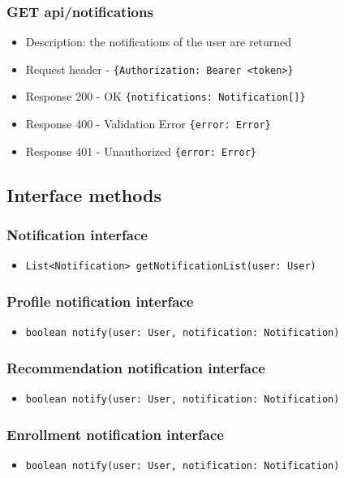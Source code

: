 \subsubsection{GET api/notifications}
\begin{itemize}
    \item Description: the notifications of the user are returned
    \item Request header - \verb|{Authorization: Bearer <token>}|
    \item Response 200 - OK \verb|{notifications: Notification[]}|
    \item Response 400 - Validation Error \verb|{error: Error}|
    \item Response 401 - Unauthorized \verb|{error: Error}|
\end{itemize}

\subsection{Interface methods}

\subsubsection{Notification interface}
\begin{itemize}
    \item \verb|List<Notification> getNotificationList(user: User)|
\end{itemize}

\subsubsection{Profile notification interface}
\begin{itemize}
    \item \verb|boolean notify(user: User, notification: Notification)|
\end{itemize}

\subsubsection{Recommendation notification interface}
\begin{itemize}
    \item \verb|boolean notify(user: User, notification: Notification)|
\end{itemize}

\subsubsection{Enrollment notification interface}
\begin{itemize}
    \item \verb|boolean notify(user: User, notification: Notification)|
\end{itemize}

